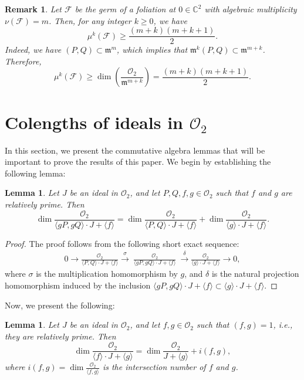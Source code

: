 \documentclass[12pt,letterpaper]{amsart}
\newcommand{\C}{\mathbb{C}}
\newtheorem{lemma}[theorem]{Lemma}
\newtheorem{remark}{Remark}[section]
\begin{document}
\begin{remark}
Let $\mathcal{F}$ be the germ of a foliation at $0\in\C^2$ with algebraic multiplicity $\nu(\mathcal{F})=m$. Then, for any integer $k\geq 0$, we have
$$
\mu^k(\mathcal{F}) \geq \frac{(m+k)(m+k+1)}{2}.
$$
Indeed, we have $( P,Q)\subset \mathfrak{m}^{m}$, which implies that $ \mathfrak{m}^k( P,Q) \subset \mathfrak{m}^{m+k}$. Therefore,
$$
\mu^k(\mathcal{F}) \geq \dim\left(\frac{\mathcal{O}_2}{\mathfrak{m}^{m+k}}\right) = \frac{(m+k)(m+k+1)}{2}.
$$
\end{remark} 




\section{Colengths of ideals in $\mathcal{O}_2$}\label{co_dimension}
In this section, we present the commutative algebra lemmas that will be important to prove the results of this paper. 
We begin by establishing the following lemma:
\begin{lemma}\label{lemma_gsv 1}
    Let $J$ be an ideal in $\mathcal{O}_2$, and let $P,Q,f,g\in\mathcal{O}_2$ such that $f$ and $g$ are relatively prime. Then
    \[\dim\frac{\mathcal{O}_2}{\langle gP,gQ\rangle\cdot J+\langle f\rangle}=\dim\frac{\mathcal{O}_2}{\langle P,Q\rangle\cdot J+\langle f\rangle}+\dim\frac{\mathcal{O}_2}{\langle g\rangle\cdot J+\langle f\rangle}.\]
\end{lemma}
\begin{proof}
The proof follows from the following short exact sequence:
\begin{align*}
0 \longrightarrow \frac{\mathcal{O}_2}{\langle P,Q\rangle\cdot J+\langle f\rangle} \xrightarrow{ \ \sigma  \ } \ \frac{\mathcal{O}_2}{\langle gP,gQ\rangle\cdot J+\langle f\rangle} \ \xrightarrow{ \ \delta  \ } \frac{\mathcal{O}_2}{\langle g\rangle\cdot J+\langle f\rangle} \longrightarrow 0,
\end{align*}
where $\sigma$ is the multiplication homomorphism by $g$, and $\delta$ is the natural projection homomorphism induced by the inclusion $\langle gP,gQ\rangle\cdot J+\langle f\rangle\subset \langle g\rangle\cdot J+\langle f\rangle$.
\end{proof}
\par Now, we present the following:
\begin{lemma}\label{lema do gsv}
  Let $J$  be an ideal in $\mathcal{O}_2$, and let $f,g\in\mathcal{O}_2$ such that $(f,g)=1$, i.e., they are relatively prime. Then
    \begin{equation}
    \nonumber
        \dim \frac{\mathcal{O}_{2}}{\langle f\rangle \cdot J +\langle g \rangle}= \dim \frac{\mathcal{O}_{2}}{J+\langle g \rangle} + i(f,g),
    \end{equation}  
where $i(f,g)=\dim\frac{\mathcal{O}_2}{\langle f,g\rangle}$ is the intersection number of $f$ and $g$. 
\end{lemma}
\end{document}
